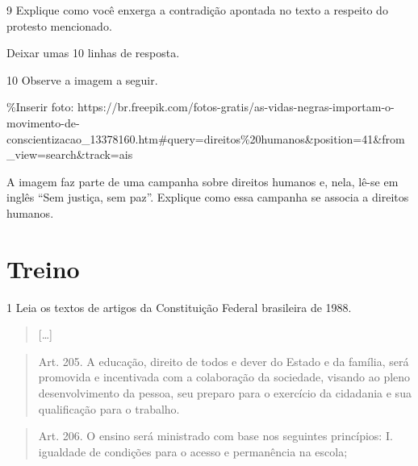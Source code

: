 \num{9} Explique como você enxerga a contradição apontada no texto a
respeito do protesto mencionado.

 Deixar umas 10 linhas de resposta.

\num{10} Observe a imagem a seguir.

\%Inserir foto:
https://br.freepik.com/fotos-gratis/as-vidas-negras-importam-o-movimento-de-conscientizacao\_13378160.htm\#query=direitos\%20humanos\&position=41\&from\_view=search\&track=ais

A imagem faz parte de uma campanha sobre direitos humanos e, nela, lê-se
em inglês ``Sem justiça, sem paz''. Explique como essa campanha se
associa a direitos humanos.


\section{Treino}

\num{1} Leia os textos de artigos da Constituição Federal brasileira de
1988.

\begin{quote}
{[}\ldots{}{]}
\end{quote}

\begin{quote}
Art. 205. A educação, direito de todos e dever do Estado e da família,
será promovida e incentivada com a colaboração da sociedade, visando ao
pleno desenvolvimento da pessoa, seu preparo para o exercício da
cidadania e sua qualificação para o trabalho.
\end{quote}

\begin{quote}
Art. 206. O ensino será ministrado com base nos seguintes princípios: I.
igualdade de condições para o acesso e permanência na escola;
\end{quote}

